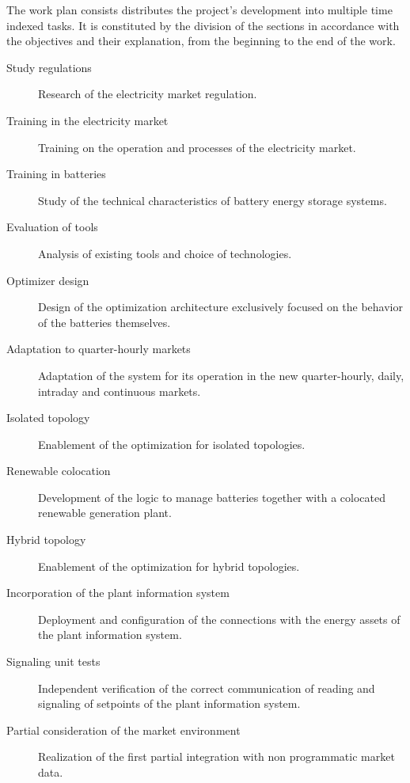 The work plan consists distributes the project's development into multiple time indexed tasks. It is constituted by the division of the sections in accordance with the objectives and their explanation, from the beginning to the end of the work.

\begin{description}

  \item[Study regulations] Research of the electricity market regulation.

  \item[Training in the electricity market] Training on the operation and processes of the electricity market.

  \item[Training in batteries] Study of the technical characteristics of battery energy storage systems.

  \item[Evaluation of tools] Analysis of existing tools and choice of technologies.

  \item[Optimizer design] Design of the optimization architecture exclusively focused on the behavior of the batteries themselves.

  \item[Adaptation to quarter-hourly markets] Adaptation of the system for its operation in the new quarter-hourly, daily, intraday and continuous markets.

  \item[Isolated topology] Enablement of the optimization for isolated topologies.

  \item[Renewable colocation] Development of the logic to manage batteries together with a colocated renewable generation plant.

  \item[Hybrid topology] Enablement of the optimization for hybrid topologies.

  \item[Incorporation of the plant information system] Deployment and configuration of the connections with the energy assets of the plant information system.

  \item[Signaling unit tests] Independent verification of the correct communication of reading and signaling of setpoints of the plant information system.

  \item[Partial consideration of the market environment] Realization of the first partial integration with non programmatic market data.


\end{description}
